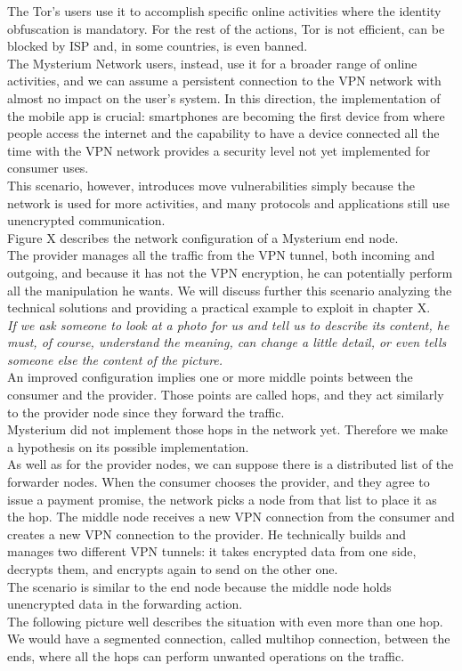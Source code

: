 \documentclass[12pt]{article}
\begin{document}
	The Tor's users use it to accomplish specific online activities where the identity obfuscation is mandatory. For the rest of the actions, Tor is not efficient, can be blocked by ISP and, in some countries, is even banned.\\
	The Mysterium Network users, instead, use it for a broader range of online activities, and we can assume a persistent connection to the VPN network with almost no impact on the user's system. In this direction, the implementation of the mobile app is crucial: smartphones are becoming the first device from where people access the internet and the capability to have a device connected all the time with the VPN network provides a security level not yet implemented for consumer uses.\\
	This scenario, however, introduces move vulnerabilities simply because the network is used for more activities, and many protocols and applications still use unencrypted communication.\\
	\bigbreak	
	Figure X describes the network configuration of a Mysterium end node.\\
	The provider manages all the traffic from the VPN tunnel, both incoming and outgoing, and because it has not the VPN encryption, he can potentially perform all the manipulation he wants. We will discuss further this scenario analyzing the technical solutions and providing a practical example to exploit in chapter X.\\
	\textit{If we ask someone to look at a photo for us and tell us to describe its content, he must, of course, understand the meaning, can change a little detail, or even tells someone else the content of the picture.}\\
	An improved configuration implies one or more middle points between the consumer and the provider. Those points are called hops, and they act similarly to the provider node since they forward the traffic.\\
	Mysterium did not implement those hops in the network yet. Therefore we make a hypothesis on its possible implementation.\\
	As well as for the provider nodes, we can suppose there is a distributed list of the forwarder nodes. When the consumer chooses the provider, and they agree to issue a payment promise, the network picks a node from that list to place it as the hop. The middle node receives a new VPN connection from the consumer and creates a new VPN connection to the provider. He technically builds and manages two different VPN tunnels: it takes encrypted data from one side, decrypts them, and encrypts again to send on the other one.\\
	The scenario is similar to the end node because the middle node holds unencrypted data in the forwarding action.\\
	The following picture well describes the situation with even more than one hop. We would have a segmented connection, called multihop connection, between the ends, where all the hops can perform unwanted operations on the traffic.\\
\end{document}
